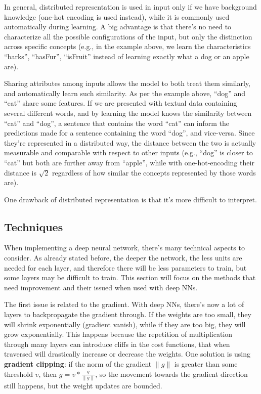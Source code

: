 In general, distributed representation is used in input only if we have background knowledge (one-hot encoding is used instead), while it is commonly used automatically during learning. A big advantage is that there's no need to characterize all the possible configurations of the input, but only the distinction across specific concepts (e.g., in the example above, we learn the characteristics ``barks'', ``hasFur'', ``isFruit'' instead of learning exactly what a dog or an apple are).

Sharing attributes among inputs allows the model to both treat them similarly, and automatically learn such similarity. As per the example above, ``dog'' and ``cat'' share some features. If we are presented with textual data containing several different words, and by learning the model knows the similarity between ``cat'' and ``dog'', a sentence that contains the word ``cat'' can inform the predictions made for a sentence containing the word ``dog'', and vice-versa. Since they're represented in a distributed way, the distance between the two is actually measurable and comparable with respect to other inputs (e.g., ``dog'' is closer to ``cat'' but both are further away from ``apple'', while with one-hot-encoding their distance is $\sqrt{2}$ regardless of how similar the concepts represented by those words are).

One drawback of distributed representation is that it's more difficult to interpret.

\subsection{Techniques}

When implementing a deep neural network, there's many technical aspects to consider. As already stated before, the deeper the network, the less units are needed for each layer, and therefore there will be less parameters to train, but some layers may be difficult to train. This section will focus on the methods that need improvement and their issued when used with deep NNs.

The first issue is related to the gradient. With deep NNs, there's now a lot of layers to backpropagate the gradient through. If the weights are too small, they will shrink exponentially (gradient vanish), while if they are too big, they will grow exponentially. This happens because the repetition of multiplication through many layers can introduce cliffs in the cost functions, that when traversed will drastically increase or decrease the weights. One solution is using \textbf{gradient clipping}: if the norm of the gradient $\|g\|$ is greater than some threshold $v$, then $g = v*\frac{g}{\|g\|}$, so the movement towards the gradient direction still happens, but the weight updates are bounded.

